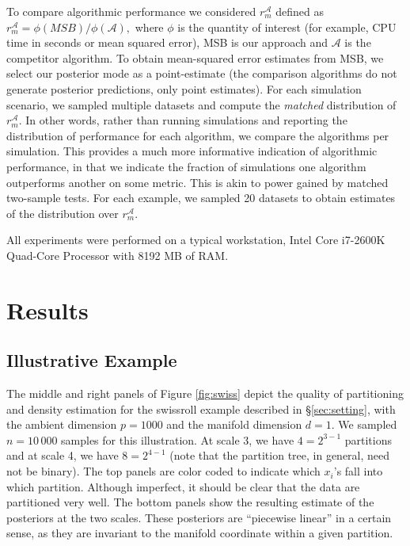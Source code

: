\documentclass{article} %
\providecommand{\mc}[1]{\mathcal{#1}}
\begin{document}
To compare algorithmic performance we considered $r_{m}^{\mc{A}}$ defined as $r_{m}^{\mc{A}}=\phi(MSB)/\phi(\mc{A}),$
where $\phi$ is the quantity of interest (for example, CPU time in seconds or mean squared error), MSB is our approach and $\mc{A}$ is the competitor algorithm. To obtain mean-squared error estimates from MSB, we select our posterior mode as a point-estimate (the comparison algorithms do not generate posterior predictions, only point estimates).
For each simulation scenario, we sampled multiple datasets and compute the \emph{matched} distribution of $r_{m}^{\mc{A}}$. In other words, rather than running simulations and reporting the distribution of performance for each algorithm, we compare the algorithms per simulation.  This provides a much more informative indication of algorithmic performance, in that we indicate the fraction of simulations one algorithm outperforms another on some metric.  This is akin to power gained by matched two-sample tests.   For each example, we sampled 20 datasets to obtain estimates of the distribution over $r_m^{\mc{A}}$.

All experiments were performed on a typical workstation, Intel Core i7-2600K Quad-Core Processor with  8192 MB of RAM.


\section{Results}

\subsection{Illustrative Example} \label{sub:ill}

The middle and right panels of Figure \ref{fig:swiss} depict the quality of partitioning and density estimation for the swissroll example described in \S \ref{sec:setting}, with the ambient dimension $p=1000$ and the manifold dimension $d=1$.  We sampled $n=10\,000$ samples for this illustration. At scale 3, we have $4=2^{3-1}$ partitions and at scale 4, we have $8=2^{4-1}$ (note that the partition tree, in general, need not be binary).  The top panels are color coded to indicate which  $x_i$'s fall into which partition.  Although imperfect, it should be clear that the data are partitioned very well.  The bottom panels show the resulting estimate of the posteriors at the two scales.  These posteriors are ``piecewise linear'' in a certain sense, as they are invariant to the manifold coordinate within a given partition.  
\end{document}
